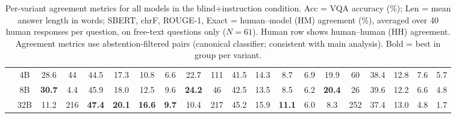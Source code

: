 \begin{table}[h]
{\begin{tabular}{lccccccc|cccccc|cccccc}
 & 4B & 28.6 & 44 & 44.5 & 17.3 & 10.8 & 6.6 & 22.7 & 111 & 41.5 & 14.3 & 8.7 & 6.9 & 19.9 & 60 & 38.4 & 12.8 & 7.6 & 5.7 \\
 & 8B & \textbf{30.7} & 4.4 & 45.9 & 18.0 & 12.5 & 9.6 & \textbf{24.2} & 46 & 42.5 & 13.5 & 8.5 & 6.2 & \textbf{20.4} & 26 & 39.6 & 12.2 & 6.6 & 4.8 \\
 & 32B & 11.2 & 216 & \textbf{47.4} & \textbf{20.1} & \textbf{16.6} & \textbf{9.7} & 10.4 & 217 & 45.2 & 15.9 & \textbf{11.1} & 6.0 & 8.3 & 252 & 37.4 & 13.0 & 4.8 & 1.7 \\
\bottomrule
\end{tabular}
}
\caption{\small Per-variant agreement metrics for all models in the blind+instruction condition. Acc = VQA accuracy (\%); Len = mean answer length in words; SBERT, chrF, ROUGE-1, Exact = human--model (HM) agreement (\%), averaged over 40 human responses per question, on free-text questions only ($N{=}61$). Human row shows human--human (HH) agreement. Agreement metrics use abstention-filtered pairs (canonical classifier; consistent with main analysis). Bold = best in group per variant.}
\label{tab:comprehensive_inst_blind}
\end{table}